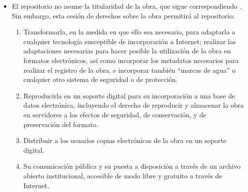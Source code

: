 \begin{itemize}

\item El repositorio no asume la titularidad de la obra, que sigue
  correspondiendo \mybookAlOrALa{} \mybookAutorOrAutora{}. Sin embargo,
  esta cesión de derechos sobre la obra permitirá al repositorio:

  \begin{enumerate}[label=\alph*]
  \item Transformarla, en la medida en que ello sea necesario, para
    adaptarla a cualquier tecnología susceptible de incorporación a
    Internet; realizar las adaptaciones necesarias para hacer posible la
    utilización de la obra en formatos electrónicos, así como incorporar
    los metadatos necesarios para realizar el registro de la obra, e
    incorporar también ``marcas de agua'' o cualquier otro sistema de
    seguridad o de protección.
  \item Reproducirla en un soporte digital para su incorporación a una
    base de datos electrónica, incluyendo el derecho de reproducir y
    almacenar la obra en servidores a los efectos de seguridad, de
    conservación, y de preservación del formato.
  \item Distribuir a los usuarios copias electrónicas de la obra en un
    soporte digital.
  \item Su comunicación pública y su puesta a disposición a través de un
    archivo abierto institucional, accesible de modo libre y gratuito a
    través de Internet.
  \end{enumerate}


\end{itemize}
